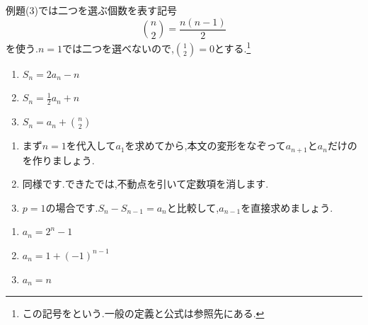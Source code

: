     例題(3)では二つを選ぶ個数を表す記号
    \[
      \binom n2=\frac{n(n-1)}2
    \]
    を使う.$n=1$では二つを選べないので,$\binom12=0$とする.\footnote{この記号をという.一般の定義と公式は参照先にある.}
    \noindent {}\par\nobreak
    \begin{enumerate}[label=(\arabic*),parsep=3pt,format=\bookitemlink{example-summation-1}{problem}{answer}]
      \item $\displaystyle S_n=2a_n-n$
      \item $\displaystyle S_n=\frac12a_n+n$
      \item $\displaystyle S_n=a_n+\binom n2$
    \end{enumerate}

    \noindent{}\par\nobreak
    \begin{enumerate}[label=(\arabic*),parsep=3pt,format=\bookitemlink{example-summation-1}{hint}{problem}]
      \item まず$n=1$を代入して$a_1$を求めてから,本文の変形をなぞって$a_{n+1}$と$a_n$だけのを作りましょう.
      \item 同様です.できたでは,不動点を引いて定数項を消します.
      \item $p=1$の場合です.$S_n-S_{n-1}=a_n$と比較して,$a_{n-1}$を直接求めましょう.
    \end{enumerate}

    \noindent{}\par\nobreak
    \begin{enumerate}[label=(\arabic*),parsep=3pt,format=\bookitemlink{example-summation-1}{answer}{problem}]
      \item $\displaystyle a_n=2^n-1$
      \item $\displaystyle a_n=1+(-1)^{n-1}$
      \item $\displaystyle a_n=n$
    \end{enumerate}

